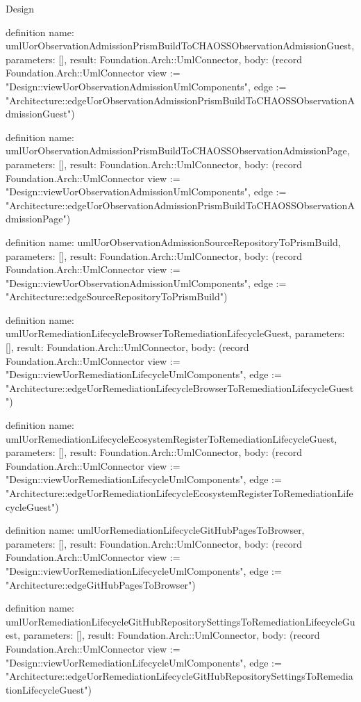 \begin{lexlean}{Design}
\begin{semanticmodule}
definition{
  name: umlUorObservationAdmissionPrismBuildToCHAOSSObservationAdmissionGuest,
  parameters: [],
  result: Foundation.Arch::UmlConnector,
  body: (record Foundation.Arch::UmlConnector {view := "Design::viewUorObservationAdmissionUmlComponents", edge := "Architecture::edgeUorObservationAdmissionPrismBuildToCHAOSSObservationAdmissionGuest"})
}

definition{
  name: umlUorObservationAdmissionPrismBuildToCHAOSSObservationAdmissionPage,
  parameters: [],
  result: Foundation.Arch::UmlConnector,
  body: (record Foundation.Arch::UmlConnector {view := "Design::viewUorObservationAdmissionUmlComponents", edge := "Architecture::edgeUorObservationAdmissionPrismBuildToCHAOSSObservationAdmissionPage"})
}

definition{
  name: umlUorObservationAdmissionSourceRepositoryToPrismBuild,
  parameters: [],
  result: Foundation.Arch::UmlConnector,
  body: (record Foundation.Arch::UmlConnector {view := "Design::viewUorObservationAdmissionUmlComponents", edge := "Architecture::edgeSourceRepositoryToPrismBuild"})
}

definition{
  name: umlUorRemediationLifecycleBrowserToRemediationLifecycleGuest,
  parameters: [],
  result: Foundation.Arch::UmlConnector,
  body: (record Foundation.Arch::UmlConnector {view := "Design::viewUorRemediationLifecycleUmlComponents", edge := "Architecture::edgeUorRemediationLifecycleBrowserToRemediationLifecycleGuest"})
}

definition{
  name: umlUorRemediationLifecycleEcosystemRegisterToRemediationLifecycleGuest,
  parameters: [],
  result: Foundation.Arch::UmlConnector,
  body: (record Foundation.Arch::UmlConnector {view := "Design::viewUorRemediationLifecycleUmlComponents", edge := "Architecture::edgeUorRemediationLifecycleEcosystemRegisterToRemediationLifecycleGuest"})
}

definition{
  name: umlUorRemediationLifecycleGitHubPagesToBrowser,
  parameters: [],
  result: Foundation.Arch::UmlConnector,
  body: (record Foundation.Arch::UmlConnector {view := "Design::viewUorRemediationLifecycleUmlComponents", edge := "Architecture::edgeGitHubPagesToBrowser"})
}

definition{
  name: umlUorRemediationLifecycleGitHubRepositorySettingsToRemediationLifecycleGuest,
  parameters: [],
  result: Foundation.Arch::UmlConnector,
  body: (record Foundation.Arch::UmlConnector {view := "Design::viewUorRemediationLifecycleUmlComponents", edge := "Architecture::edgeUorRemediationLifecycleGitHubRepositorySettingsToRemediationLifecycleGuest"})
}


\end{semanticmodule}
\end{lexlean}

